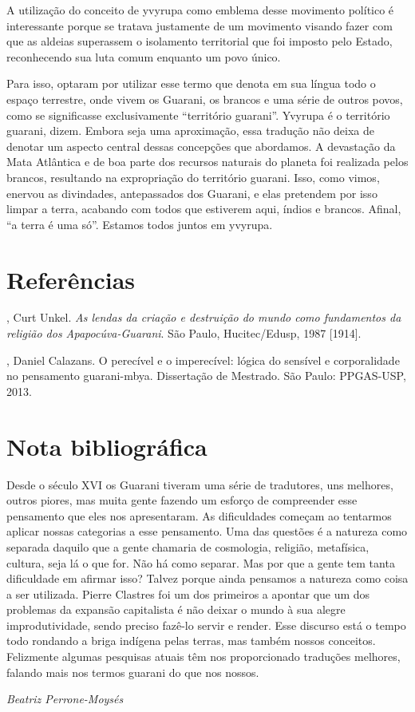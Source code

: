 A utilização do conceito de yvyrupa como emblema desse movimento
político é interessante porque se tratava justamente de um movimento
visando fazer com que as aldeias superassem o isolamento territorial
que foi imposto pelo Estado, reconhecendo sua luta comum enquanto um
povo único.

Para isso, optaram por utilizar esse termo que denota em sua língua todo
o espaço terrestre, onde vivem os Guarani, os brancos e uma série de
outros povos, como se significasse exclusivamente ``território guarani''.
Yvyrupa é o território guarani, dizem. Embora seja uma aproximação,
essa tradução não deixa de denotar um aspecto central dessas concepções
que abordamos. A devastação da Mata Atlântica e de boa parte dos
recursos naturais do planeta foi realizada pelos brancos, resultando na
expropriação do território guarani. Isso, como vimos, enervou as
divindades, antepassados dos Guarani, e elas pretendem por isso limpar
a terra, acabando com todos que estiverem aqui, índios e brancos.
Afinal, ``a terra é uma só''. Estamos todos juntos em yvyrupa.

\section{Referências}

\begin{bibliohedra}
, Curt Unkel. \emph{As lendas da criação e destruição do mundo
como fundamentos da religião dos Apapocúva-Guarani}. São Paulo,
Hucitec/Edusp, 1987 [1914].

, Daniel Calazans. O perecível e o imperecível: lógica do
sensível e corporalidade no pensamento guarani-mbya. Dissertação de
Mestrado. São Paulo: PPGAS-USP, 2013.

\end{bibliohedra}

\section{Nota bibliográfica}
Desde o século XVI os Guarani tiveram uma série de tradutores, uns
melhores, outros piores, mas muita gente fazendo um esforço de
compreender esse pensamento que eles nos apresentaram. As dificuldades
começam ao tentarmos aplicar nossas categorias a esse pensamento. Uma
das questões é a natureza como separada daquilo que a gente chamaria de
cosmologia, religião, metafísica, cultura, seja lá o que for. Não há
como separar. Mas por que a gente tem tanta dificuldade em afirmar
isso? Talvez porque ainda pensamos a natureza como coisa a ser
utilizada. Pierre Clastres foi um dos primeiros a apontar que um dos
problemas da expansão capitalista é não deixar o mundo à sua alegre
improdutividade, sendo preciso fazê-lo servir e render. Esse discurso
está o tempo todo rondando a briga indígena pelas terras, mas também
nossos conceitos. Felizmente algumas pesquisas atuais têm nos
proporcionado traduções melhores, falando mais nos termos guarani do
que nos nossos.
\medskip
\begin{flushright}
\emph{Beatriz Perrone-Moysés}
\end{flushright}


